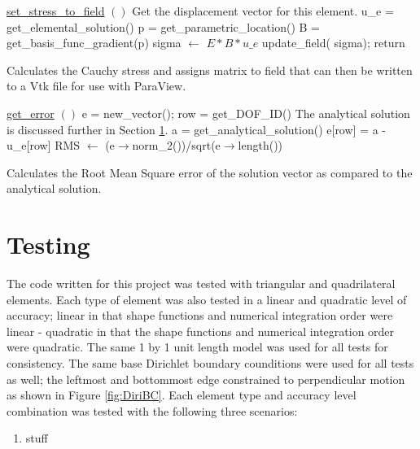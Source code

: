 \documentclass[a4paper, 12pt]{article}
\begin{document}
\vspace{\baselineskip}
\begin{algorithm}[H]
  \underline{set\_stress\_to\_field} $()$
  \BlankLine
  {
    \tcc
    {
      Get the displacement vector for this element.
    }
    u\_e = get\_elemental\_solution()\;
    {
      p = get\_parametric\_location()\;
      B = get\_basis\_func\_gradient(p)\;
      sigma $\leftarrow$ $E*B*u\_e$ \;
    }
    update\_field( sigma);
  }
  return\;
  \caption{Calculates the Cauchy stress and assigns matrix to field that
           can then be written to a Vtk file for use with ParaView.}
  \label{al:CauchyStress}
\end{algorithm}

\vspace{\baselineskip}
\begin{algorithm}[H]
  \underline{get\_error} $()$
  \BlankLine
  e = new\_vector();
  {
    {
      row = get\_DOF\_ID()\;
      \tcc
      {
        The analytical solution is discussed further in
        Section \ref{sec:testing}.
      }
      a = get\_analytical\_solution()\;
      e[row] = a - u\_e[row]\;
    }
  }
  RMS $\leftarrow$ (e$\rightarrow$norm\_2())/sqrt(e$\rightarrow$length())\;
  \caption{Calculates the Root Mean Square error of 
            the solution vector as compared to the analytical solution.}
  \label{al:getError}
\end{algorithm}
\vspace{\baselineskip}

\section{Testing} \label{sec:testing}
The code written for this project was tested with triangular and 
quadrilateral elements. Each type of element was also 
tested in a linear and quadratic level of accuracy;
linear in that shape functions and numerical integration 
order were linear - quadratic in that the shape functions and
numerical integration order were quadratic.
The same 1 by 1 unit length model was used for all tests for 
consistency. The same base Dirichlet boundary counditions were used
for all tests as well; the leftmost and bottommost edge 
constrained to perpendicular motion as shown in Figure \ref{fig:DiriBC}.
Each element type and accuracy level combination was tested with
the following three scenarios:

\begin{enumerate}
  \item  stuff

\end{enumerate}
\end{document}
